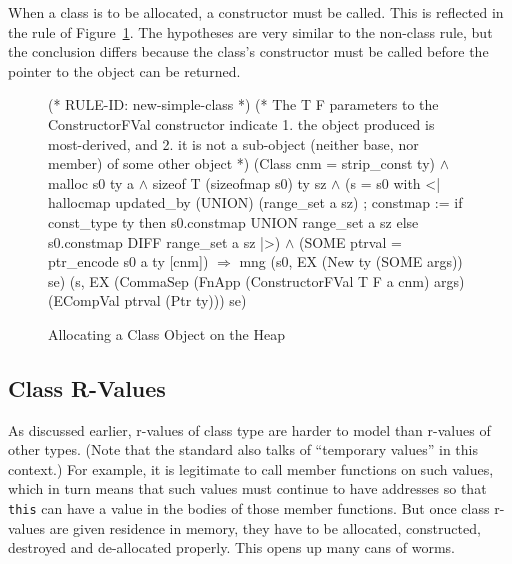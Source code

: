 \documentclass[11pt]{article}
\begin{document}
When a class is to be allocated, a constructor must be called.  This
is reflected in the rule of Figure~\ref{fig:new-simple-class}.   The
hypotheses are very similar to the non-class rule, but the conclusion
differs because the class's constructor must be called before the
pointer to the object can be returned.
\begin{figure}[htbp]
\begin{stdrule}
(* RULE-ID: new-simple-class *)
(* The T F parameters to the ConstructorFVal constructor indicate
    1. the object produced is most-derived, and
    2. it is not a sub-object (neither base, nor member) of some
       other object
*)
     (Class cnm = strip_const ty) \(\land\)
     malloc s0 ty a \(\land\)
     sizeof T (sizeofmap s0) ty sz \(\land\)
     (s = s0 with <|
             hallocmap updated_by (UNION) (range_set a sz) ;
             constmap := if const_type ty then
                           s0.constmap UNION range_set a sz
                         else s0.constmap DIFF range_set a sz
          |>) \(\land\)
     (SOME ptrval = ptr_encode s0 a ty [cnm])
   \(\Rightarrow\)
     mng (s0, EX (New ty (SOME args)) se)
         (s, EX (CommaSep (FnApp (ConstructorFVal T F a cnm) args)
                          (ECompVal ptrval (Ptr ty)))
                se)
\end{stdrule}
\caption{Allocating a Class Object on the Heap}
\label{fig:new-simple-class}
\end{figure}

\subsection{Class R-Values}
\label{sec:class-rvalues}

As discussed earlier, r-values of class type are harder to model than
r-values of other types.  (Note that the standard also talks of
``temporary values'' in this context.) For example, it is legitimate
to call member functions on such values, which in turn means that such
values must continue to have addresses so that \texttt{this} can have
a value in the bodies of those member functions.  But once class
r-values are given residence in memory, they have to be allocated,
constructed, destroyed and de-allocated properly.  This opens up many
cans of worms.
\end{document}
